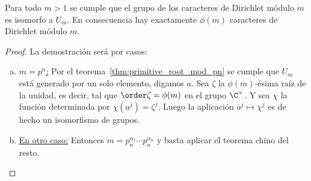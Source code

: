 \documentclass[teoria-numeros.tex]{subfiles}
\begin{document}
\begin{thm}
	Para todo $m > 1$ se cumple que el grupo de los caracteres de Dirichlet módulo $m$ es isomorfo a $U_m$.
	En consecuencia hay exactamente $\phi(m)$ caracteres de Dirichlet módulo $m$.
\end{thm}
\begin{proof}
	La demostración será por casos:
	\begin{enumerate}[a)]
		\item \underline{$m = p^n$:}
			Por el teorema~\ref{thm:primitive_root_mod_pn} se cumple que $U_m$ está generado por un solo elemento, digamos $a$. 
			Sea $\zeta$ la $\phi(m)$-ésima raíz de la unidad, es decir, tal que $\order\zeta = \phi(m)$ en el grupo $\C^\times$.
			Y sea $\chi$ la función determinada por $\chi(a^j) = \zeta^j$.
			Luego la aplicación $a^j \mapsto \chi^j$ es de hecho un isomorfismo de grupos.

		\item \underline{En otro caso:}
			Entonces $m = p_n^{\alpha_1} \cdots p_n^{\alpha_n}$ y basta aplicar el teorema chino del resto. \qedhere
	\end{enumerate}
\end{proof}
\end{document}
